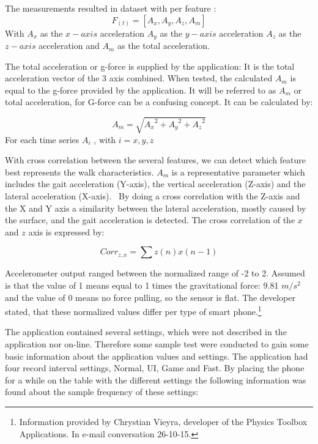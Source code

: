 The measurements resulted in dataset with per feature :
\begin{equation} 
	F_{(t)} = [A_{x}, A_{y}, A_{z}, A_{m}] 
\end{equation}
With $A_{x}$ as the $x-axis$ acceleration
$A_{y}$ as the $y-axis$ acceleration
$A_{z}$ as the $z-axis$ acceleration and
$A_{m}$ as the total acceleration.

The total acceleration or g-force is supplied by the application: It is the total acceleration vector of the 3 axis combined. When tested, the calculated $A_{m}$ is equal to the g-force provided by the application. It will be referred to as $A_{m}$ or total acceleration, for G-force can be a confusing concept. It can be calculated by:

\begin{equation}
A_{m} = \sqrt {{A_{x}}^{2} + {A_{y}}^{2} + {A_{z}}^ {2}}
\end{equation} For each time series $A_{i}$ , with $i = {x, y, z}$ 

With cross correlation between the several features, we can detect which feature best represents the walk characteristics. $A_{m}$ is a representative parameter which includes the gait acceleration (Y-axis), the vertical acceleration (Z-axis) and the lateral acceleration (X-axis).~\cite{Weiss2014} By doing a cross correlation with the Z-axis and the X and Y axis a similarity between the lateral acceleration, mostly caused by the surface, and the gait acceleration is detected. The cross correlation of the $x$ and $z$ axis is expressed by:

\begin{equation}
Corr_{z,x} = \sum z(n)x(n-1) %
\end{equation}

Accelerometer output ranged between the normalized range of -2 to 2. Assumed is that the value of 1 means equal to 1 times the gravitational force: 9.81 $m/s^2$ and the value of 0 means no force pulling, so the sensor is flat. The developer stated, that these normalized values differ per type of smart phone.\footnote{Information provided by Chrystian Vieyra, developer of the Physics Toolbox Applications. In e-mail conversation 26-10-15. }

The application contained several settings, which were not described in the application nor on-line. Therefore some sample test were conducted to gain some basic information about the application values and settings. The application had four record interval settings, Normal, UI, Game and Fast. By placing the phone for a while on the table with the different settings the following information was found about the sample frequency of these settings: 

